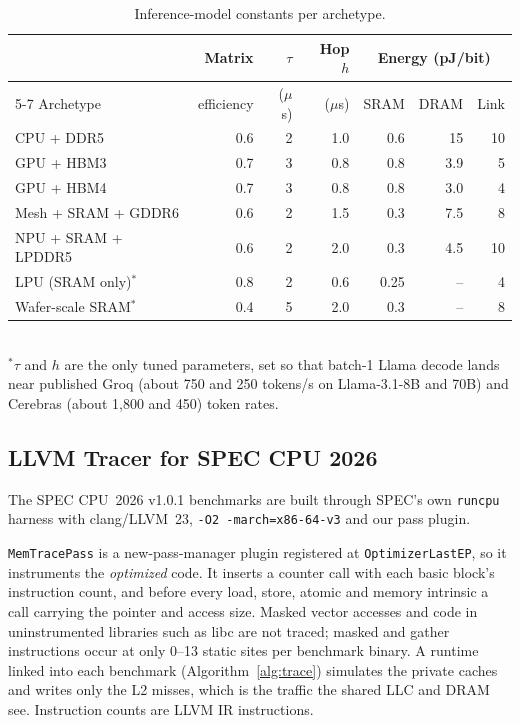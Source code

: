 \documentclass[12pt]{article}
\begin{document}
\begin{table}[htbp]
\centering
\caption{Inference-model constants per archetype.}
\label{tab:const}
\small
\begin{tabular}{@{}lrrrrrr@{}}
\toprule
 & Matrix & $\tau$ & Hop $h$ & \multicolumn{3}{c}{Energy (pJ/bit)}\\
\cmidrule{5-7}
Archetype & efficiency & ($\mu$s) & ($\mu$s) & SRAM & DRAM & Link\\
\midrule
CPU + DDR5 & 0.6 & 2 & 1.0 & 0.6 & 15 & 10\\
GPU + HBM3 & 0.7 & 3 & 0.8 & 0.8 & 3.9 & 5\\
GPU + HBM4 & 0.7 & 3 & 0.8 & 0.8 & 3.0 & 4\\
Mesh + SRAM + GDDR6 & 0.6 & 2 & 1.5 & 0.3 & 7.5 & 8\\
NPU + SRAM + LPDDR5 & 0.6 & 2 & 2.0 & 0.3 & 4.5 & 10\\
LPU (SRAM only)$^\ast$ & 0.8 & 2 & 0.6 & 0.25 & -- & 4\\
Wafer-scale SRAM$^\ast$ & 0.4 & 5 & 2.0 & 0.3 & -- & 8\\
\bottomrule
\end{tabular}\\[2pt]
{\footnotesize $^\ast\tau$ and $h$ are the only tuned parameters, set so that batch-1 Llama decode lands near published Groq (about 750 and 250 tokens/s on Llama-3.1-8B and 70B) and Cerebras (about 1,800 and 450) token rates.}
\end{table}

\subsection{LLVM Tracer for SPEC CPU 2026}
The SPEC CPU~2026 v1.0.1 benchmarks are built through SPEC's own \texttt{runcpu} harness with clang/LLVM~23, \texttt{-O2 -march=x86-64-v3} and our pass plugin.

\texttt{MemTracePass} is a new-pass-manager plugin registered at \texttt{OptimizerLastEP}, so it instruments the \emph{optimized} code. It inserts a counter call with each basic block's instruction count, and before every load, store, atomic and memory intrinsic a call carrying the pointer and access size. Masked vector accesses and code in uninstrumented libraries such as libc are not traced; masked and gather instructions occur at only 0--13 static sites per benchmark binary. A runtime linked into each benchmark (Algorithm~\ref{alg:trace}) simulates the private caches and writes only the L2 misses, which is the traffic the shared LLC and DRAM see. Instruction counts are LLVM IR instructions.
\end{document}
